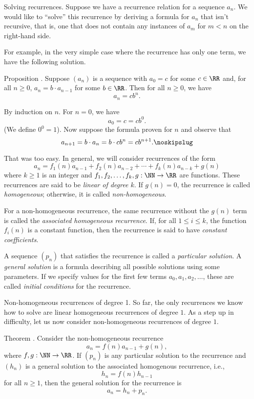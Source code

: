 \medskip\boldlabel Solving recurrences. Suppose we have a recurrence relation for a sequence $a_n$.
We would like to ``solve'' this recurrence by deriving a formula for $a_n$ that isn't recursive,
that is, one that does not contain any instances of $a_m$ for $m<n$ on the right-hand side.

For example, in the very simple case where the recurrence has only one term, we have the following
solution.

\edef\prophomoone{\the\thmcount}
\proclaim Proposition \advthm. Suppose $(a_n)$ is a sequence with $a_0 = c$ for some $c\in \RR$
and, for all $n\ge 0$, $a_n = b\cdot a_{n-1}$ for some $b\in \RR$.
Then for all $n\ge 0$, we have
$$ a_n = c b^n.$$

\proof By induction on $n$. For $n=0$, we have
$$ a_0 = c = cb^0.$$
(We define $0^0 = 1$). Now suppose the formula proven for $n$ and observe that
$$ a_{n+1} = b\cdot a_n = b\cdot cb^n = cb^{n+1}.\noskipslug$$

That was too easy. In general, we will consider recurrences of the form
$$ a_n = f_1(n) a_{n-1} + f_2(n)a_{n-2} + \cdots + f_k(n) a_{n-k} + g(n)$$
where $k\ge 1$ is an integer and $f_1, f_2, \ldots, f_k, g : \NN \to \RR$ are functions.
These recurrences are said to be {\it linear of degree $k$}. If $g(n) = 0$,
the recurrence is called {\it homogeneous}; otherwise, it is called {\it non-homogeneous}.

For a non-homogeneous recurrence, the same recurrence without the $g(n)$ term is called
the {\it associated homogeneous recurrence}.
If, for all $1\le i\le k$, the function $f_i(n)$ is a constant function, then the recurrence
is said to have {\it constant coefficients}.

A sequence $(p_n)$ that satisfies the recurrence is called a {\it particular solution}.
A {\it general solution} is a formula describing all possible solutions using some parameters.
If we specify values for the first few terms $a_0, a_1, a_2,\ldots$, these are called
{\it initial conditions} for the recurrence.

\medskip\boldlabel{} Non-homogeneous recurrences of degree 1.
So far, the only recurrences we know how to solve are
linear homogeneous recurrences of degree $1$.
As a step up in difficulty, let us now consider non-homogeneous recurrences of degree $1$.

\edef\thmnonhomoone{\the\thmcount}
\proclaim Theorem \advthm. Consider the non-homogeneous recurrence
$$a_n = f(n)a_{n-1} + g(n),$$
where $f,g:\NN\to \RR$. If $(p_n)$ is any particular solution to the recurrence
and $(h_n)$ is a general solution to the associated homogenous recurrence, i.e.,
$$ h_n = f(n) h_{n-1}$$
for all $n\ge 1$, then the general solution for the recurrence is
$$a_n = h_n + p_n.$$

